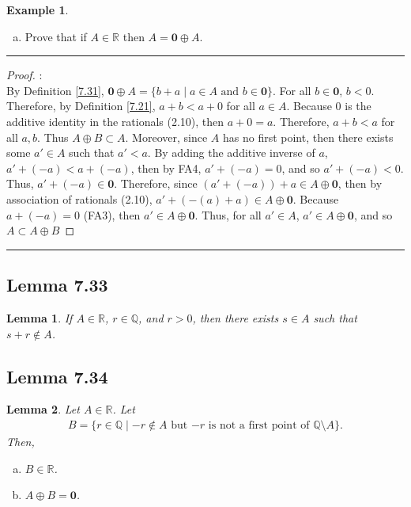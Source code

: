 \documentclass[openany, amssymb, psamsfonts]{amsart}
\newcommand{\bbQ}{\mathbb{Q}}
\newcommand{\bbR}{\mathbb{R}}
\newtheorem{lem}{Lemma}[section]
\theoremstyle{definition}
\newtheorem{exmp}{Example}[section]
\numberwithin{equation}{section}
\begin{document}
\begin{exmp}
\begin{enumerate}[(a)]
\begin{proof}
\begin{enumerate}
\end{enumerate}
\end{proof}
\vspace{4pt}     \hrule   \vspace{4pt}
		\item Prove that if $A \in \bbR$ then $A = \mathbf{0} \oplus A$. 
	\end{enumerate}
     \vspace{4pt}     \hrule   \vspace{4pt}
  \begin{proof}:\\
By Definition \ref{7.31}, $\textbf{0}\oplus A = \{b + a \mid a \in A\text{ and }b \in \textbf{0}\}$. For all $b\in \textbf{0}$, $b<0$. Therefore, by Definition \ref{7.21}, $a+b<a+0$ for all $a\in A$. Because $0$ is the additive identity in the rationals (2.10), then $a+0 = a$. Therefore, $a+b <a$ for all $a,b$. Thus $A\oplus B \subset A$. Moreover, since $A$ has no first point, then there exists some $a'\in A$ such that $a'<a$. By adding the additive inverse of $a$, $a'+(-a)<a+(-a)$, then by FA4, $a'+(-a)=0$, and so $a'+(-a)<0$. Thus, $a'+(-a)\in \textbf{0}$. Therefore, since $(a'+(-a))+a\in A \oplus \textbf{0}$, then by association of rationals (2.10), $a'+(-(a)+a)\in A \oplus \textbf{0}$. Because $a+(-a)= 0$ (FA3), then $a'\in A \oplus \textbf{0}$. Thus, for all $a' \in A$, $a'\in A \oplus \textbf{0}$, and so $A\subset A\oplus B$
\end{proof}
\vspace{4pt}     \hrule   \vspace{4pt}
\end{exmp}

\subsection*{Lemma 7.33}
\begin{lem}
\label{7.33}
	\label{lem:in A close to not in A}
	If $A\in\bbR$, $r\in\bbQ$, and $r>0$, then there exists $s\in A$ such that $s+r\not\in A$.

\end{lem}

\subsection*{Lemma 7.34}
\begin{lem}
\label{7.34}
	Let $A\in\bbR$. Let
	\begin{align*}
	B= \{r \in \bbQ \mid -r \notin A\text{ but } {-r} \text{ is not a first point of }\bbQ \setminus A\}.
	\end{align*}
	Then,
	\begin{enumerate}[(a)]
		\item $B \in \bbR$.
		\item $A \oplus B = \mathbf{0}$.
		
	\end{enumerate}
\end{lem}
\end{document}
